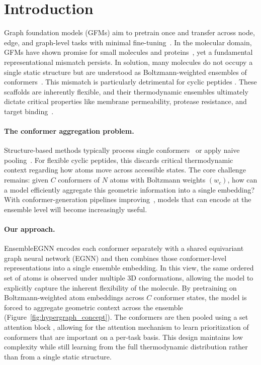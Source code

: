 \documentclass{article}
\begin{document}
\section{Introduction}
\label{sec:intro}

Graph foundation models (GFMs) aim to pretrain once and transfer across node, edge, and graph-level tasks with minimal fine-tuning~\citep{liu2025graph}. In the molecular domain, GFMs have shown promise for small molecules and proteins~\citep{mendez2024mole, hsu2022learning}, yet a fundamental representational mismatch persists. In solution, many molecules do not occupy a single static structure but are understood as Boltzmann-weighted ensembles of conformers~\citep{chandler1987introduction, tuckerman2023statistical}. This mismatch is particularly detrimental for cyclic peptides \cite{hui2025molecular, bayaraa2026fast, damjanovic2021elucidating}. These scaffolds are inherently flexible, and their thermodynamic ensembles ultimately dictate critical properties like membrane permeability, protease resistance, and target binding~\citep{yudin2015macrocycles, calvo2025computational}.

\paragraph{The conformer aggregation problem.}
Structure-based methods typically process single conformers~\citep{otero2025pepmnet, liu2026molx} or apply naive pooling~\citep{zhu2024learning}. For flexible cyclic peptides, this discards critical thermodynamic context regarding how atoms move across accessible states. The core challenge remains: given $C$ conformers of $N$ atoms with Boltzmann weights $(w_c)$, how can a model efficiently aggregate this geometric information into a single embedding? With conformer-generation pipelines improving~\citep{aranganathan2025modeling}, models that can encode at the ensemble level will become increasingly useful.

\paragraph{Our approach.}
EnsembleEGNN encodes each conformer separately with a shared equivariant graph neural network (EGNN) \cite{satorras2021en} and then combines those conformer-level representations into a single ensemble embedding. In this view, the same ordered set of atoms is observed under multiple 3D conformations, allowing the model to explicitly capture the inherent flexibility of the molecule. By pretraining on Boltzmann-weighted atom embeddings across $C$ conformer states, the model is forced to aggregate geometric context across the ensemble (Figure~\ref{fig:hypergraph_concept}). The conformers are then pooled using a set attention block \cite{lee2019set}, allowing for the attention mechanism to learn prioritization of conformers that are important on a per-task basis. This design maintains low complexity while still learning from the full thermodynamic distribution rather than from a single static structure.
\end{document}
